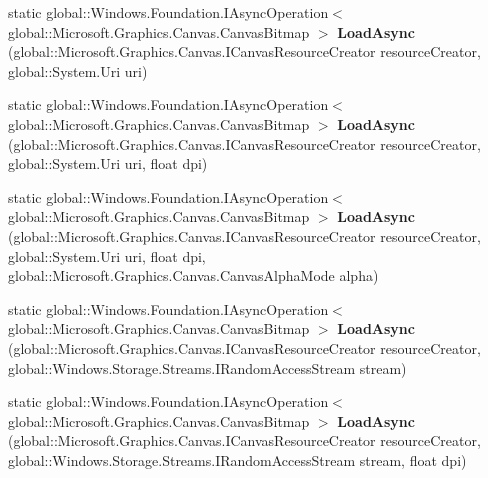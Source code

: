 \begin{DoxyCompactItemize}
\mbox{\label{class_microsoft_1_1_graphics_1_1_canvas_1_1_canvas_bitmap_a29af06676a85a4ad0adfc9e766d96ae1}} 
static global\+::\+Windows.\+Foundation.\+I\+Async\+Operation$<$ global\+::\+Microsoft.\+Graphics.\+Canvas.\+Canvas\+Bitmap $>$ {\bfseries Load\+Async} (global\+::\+Microsoft.\+Graphics.\+Canvas.\+I\+Canvas\+Resource\+Creator resource\+Creator, global\+::\+System.\+Uri uri)
\item 
\mbox{\label{class_microsoft_1_1_graphics_1_1_canvas_1_1_canvas_bitmap_a18f1f34916c8b70dc7ff8d8044e0ba43}} 
static global\+::\+Windows.\+Foundation.\+I\+Async\+Operation$<$ global\+::\+Microsoft.\+Graphics.\+Canvas.\+Canvas\+Bitmap $>$ {\bfseries Load\+Async} (global\+::\+Microsoft.\+Graphics.\+Canvas.\+I\+Canvas\+Resource\+Creator resource\+Creator, global\+::\+System.\+Uri uri, float dpi)
\item 
\mbox{\label{class_microsoft_1_1_graphics_1_1_canvas_1_1_canvas_bitmap_aeebce5625f77585197137344e96fb39d}} 
static global\+::\+Windows.\+Foundation.\+I\+Async\+Operation$<$ global\+::\+Microsoft.\+Graphics.\+Canvas.\+Canvas\+Bitmap $>$ {\bfseries Load\+Async} (global\+::\+Microsoft.\+Graphics.\+Canvas.\+I\+Canvas\+Resource\+Creator resource\+Creator, global\+::\+System.\+Uri uri, float dpi, global\+::\+Microsoft.\+Graphics.\+Canvas.\+Canvas\+Alpha\+Mode alpha)
\item 
\mbox{\label{class_microsoft_1_1_graphics_1_1_canvas_1_1_canvas_bitmap_af12c77561765c9cbef9957e4bb137793}} 
static global\+::\+Windows.\+Foundation.\+I\+Async\+Operation$<$ global\+::\+Microsoft.\+Graphics.\+Canvas.\+Canvas\+Bitmap $>$ {\bfseries Load\+Async} (global\+::\+Microsoft.\+Graphics.\+Canvas.\+I\+Canvas\+Resource\+Creator resource\+Creator, global\+::\+Windows.\+Storage.\+Streams.\+I\+Random\+Access\+Stream stream)
\item 
\mbox{\label{class_microsoft_1_1_graphics_1_1_canvas_1_1_canvas_bitmap_ad38ec735e08607b9ecf7bbd6f1a7d229}} 
static global\+::\+Windows.\+Foundation.\+I\+Async\+Operation$<$ global\+::\+Microsoft.\+Graphics.\+Canvas.\+Canvas\+Bitmap $>$ {\bfseries Load\+Async} (global\+::\+Microsoft.\+Graphics.\+Canvas.\+I\+Canvas\+Resource\+Creator resource\+Creator, global\+::\+Windows.\+Storage.\+Streams.\+I\+Random\+Access\+Stream stream, float dpi)

\end{DoxyCompactItemize}
